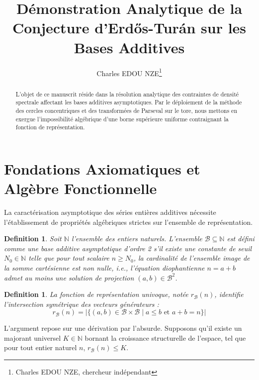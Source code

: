 \documentclass[11pt,a4paper]{article}
\title{Démonstration Analytique de la Conjecture d'Erdős-Turán sur les Bases Additives}
\author{Charles EDOU NZE\thanks{Charles EDOU NZE, chercheur indépendant}}
\date{}
\newtheorem{definition}[theorem]{Definition}
\begin{document}
\maketitle

\begin{abstract}
L'objet de ce manuscrit réside dans la résolution analytique des contraintes de densité spectrale affectant les bases additives asymptotiques. Par le déploiement de la méthode des cercles concentriques et des transformées de Parseval sur le tore, nous mettons en exergue l'impossibilité algébrique d'une borne supérieure uniforme contraignant la fonction de représentation.
\end{abstract}

\tableofcontents
\newpage

\section{Fondations Axiomatiques et Algèbre Fonctionnelle}

La caractérisation asymptotique des séries entières additives nécessite l'établissement de propriétés algébriques strictes sur l'ensemble de représentation.

\begin{definition}
Soit $\mathbb{N}$ l'ensemble des entiers naturels. L'ensemble $\mathcal{B} \subseteq \mathbb{N}$ est défini comme une base additive asymptotique d'ordre 2 s'il existe une constante de seuil $N_0 \in \mathbb{N}$ telle que pour tout scalaire $n \ge N_0$, la cardinalité de l'ensemble image de la somme cartésienne est non nulle, i.e., l'équation diophantienne $n = a + b$ admet au moins une solution de projection $(a, b) \in \mathcal{B}^2$.
\end{definition}

\begin{definition}
La fonction de représentation univoque, notée $r_{\mathcal{B}}(n)$, identifie l'intersection symétrique des vecteurs générateurs :
\begin{equation}
r_{\mathcal{B}}(n) = \left| \{ (a, b) \in \mathcal{B} \times \mathcal{B} \mid a \le b \text{ et } a + b = n \} \right|
\end{equation}
\end{definition}

L'argument repose sur une dérivation par l'absurde. Supposons qu'il existe un majorant universel $K \in \mathbb{N}$ bornant la croissance structurelle de l'espace, tel que pour tout entier naturel $n$, $r_{\mathcal{B}}(n) \le K$.
\end{document}
